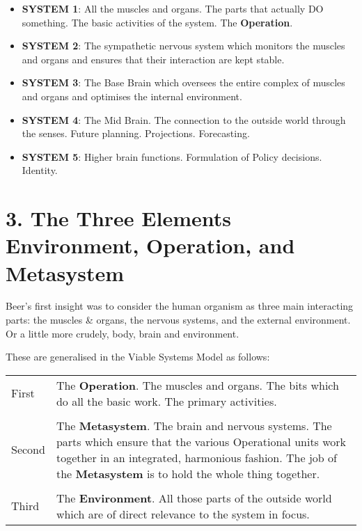 \begin{itemize}
  \item \textbf{SYSTEM 1}: All the muscles and organs. The parts that actually DO something. The basic activities of the system. The \textcolor{O}{\textbf{Operation}}.

  \item \textbf{SYSTEM 2}: The sympathetic nervous system which monitors the muscles and organs and ensures that their interaction are kept stable.

  \item \textbf{SYSTEM 3}: The Base Brain which oversees the entire complex of muscles and organs and optimises the internal environment.

  \item \textbf{SYSTEM 4}: The Mid Brain. The connection to the outside world through the senses. Future planning. Projections. Forecasting.

  \item \textbf{SYSTEM 5}: Higher brain functions. Formulation of Policy decisions. Identity.

\end{itemize}

\section*{3. The Three Elements \textcolor{E}{Environment}, \textcolor{O}{Operation}, and \textcolor{M}{Metasystem}}
Beer's first insight was to consider the human organism as three main interacting parts: the muscles \& organs, the nervous systems, and the external environment. Or a little more crudely, body, brain and environment.

These are generalised in the Viable Systems Model as follows:

\begin{tabular}{  p{}  p{} }
First	&	The \textcolor{O}{\textbf{Operation}}. The muscles and organs. The bits which do all the basic work. The primary activities.\\
\\
Second	&	The \textcolor{M}{\textbf{Metasystem}}. The brain and nervous systems. The parts which ensure that the various Operational units work together in an integrated, harmonious fashion. The job of the \textcolor{M}{\textbf{Metasystem}} is to hold the whole thing together.\\
\\
Third	&	The \textcolor{E}{\textbf{Environment}}. All those parts of the outside world which are of direct relevance to the system in focus.
\end{tabular}


